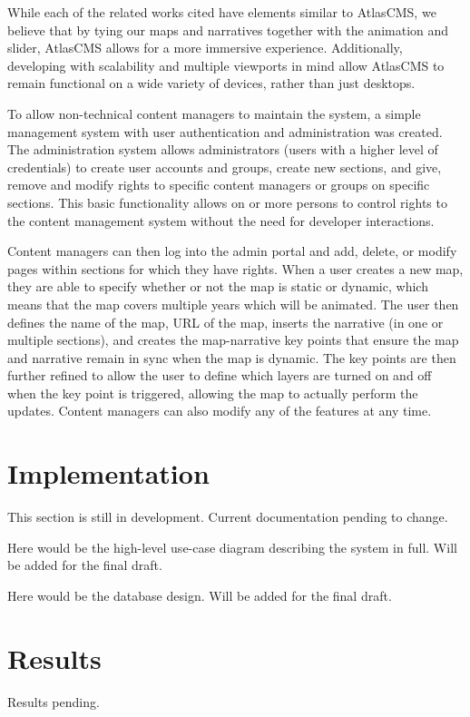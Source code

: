 \documentclass[11pt, draftcls, conference, onecolumn]{IEEEtran}
\begin{document}
While each of the related works cited have elements similar to AtlasCMS, we believe that by tying our maps and narratives together with the animation and slider, AtlasCMS allows for a more immersive experience. Additionally, developing with scalability and multiple viewports in mind allow AtlasCMS to remain functional on a wide variety of devices, rather than just desktops.

To allow non-technical content managers to maintain the system, a simple management system with user authentication and administration was created. The administration system allows administrators (users with a higher level of credentials) to create user accounts and groups, create new sections, and give, remove and modify rights to specific content managers or groups on specific sections. This basic functionality allows on or more persons to control rights to the content management system without the need for developer interactions.

Content managers can then log into the admin portal and add, delete, or modify pages within sections for which they have rights. When a user creates a new map, they are able to specify whether or not the map is static or dynamic, which means that the map covers multiple years which will be animated. The user then defines the name of the map, URL of the map, inserts the narrative (in one or multiple sections), and creates the map-narrative key points that ensure the map and narrative remain in sync when the map is dynamic. The key points are then further refined to allow the user to define which layers are turned on and off when the key point is triggered, allowing the map to actually perform the updates. Content managers can also modify any of the features at any time.

\section{Implementation}
This section is still in development. Current documentation pending to change.



Here would be the high-level use-case diagram describing the system in full. Will be added for the final draft.

Here would be the database design. Will be added for the final draft.

\section{Results}
Results pending.
\end{document}
